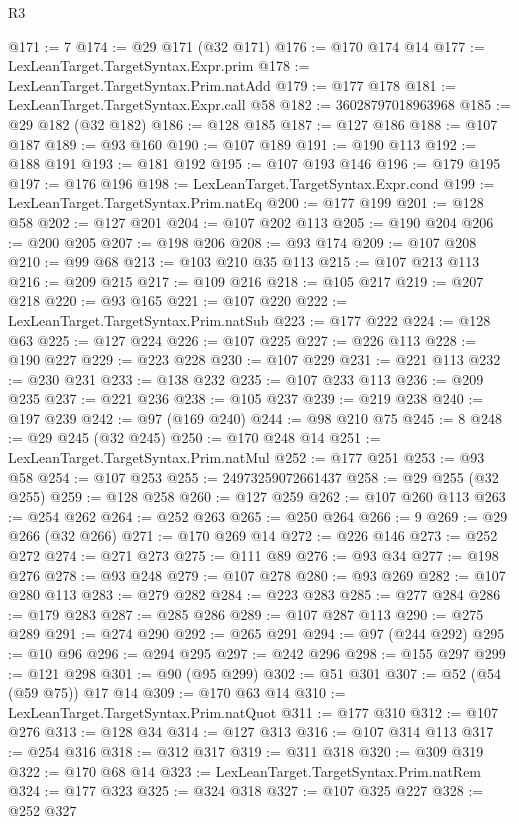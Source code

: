 \begin{lexlean}{R3}
\begin{coremodule}
@171 := 7
@174 := @29 @171 (@32 @171)
@176 := @170 @174 @14
@177 := LexLeanTarget.TargetSyntax.Expr.prim
@178 := LexLeanTarget.TargetSyntax.Prim.natAdd
@179 := @177 @178
@181 := LexLeanTarget.TargetSyntax.Expr.call @58
@182 := 36028797018963968
@185 := @29 @182 (@32 @182)
@186 := @128 @185
@187 := @127 @186
@188 := @107 @187
@189 := @93 @160
@190 := @107 @189
@191 := @190 @113
@192 := @188 @191
@193 := @181 @192
@195 := @107 @193 @146
@196 := @179 @195
@197 := @176 @196
@198 := LexLeanTarget.TargetSyntax.Expr.cond
@199 := LexLeanTarget.TargetSyntax.Prim.natEq
@200 := @177 @199
@201 := @128 @58
@202 := @127 @201
@204 := @107 @202 @113
@205 := @190 @204
@206 := @200 @205
@207 := @198 @206
@208 := @93 @174
@209 := @107 @208
@210 := @99 @68
@213 := @103 @210 @35 @113
@215 := @107 @213 @113
@216 := @209 @215
@217 := @109 @216
@218 := @105 @217
@219 := @207 @218
@220 := @93 @165
@221 := @107 @220
@222 := LexLeanTarget.TargetSyntax.Prim.natSub
@223 := @177 @222
@224 := @128 @63
@225 := @127 @224
@226 := @107 @225
@227 := @226 @113
@228 := @190 @227
@229 := @223 @228
@230 := @107 @229
@231 := @221 @113
@232 := @230 @231
@233 := @138 @232
@235 := @107 @233 @113
@236 := @209 @235
@237 := @221 @236
@238 := @105 @237
@239 := @219 @238
@240 := @197 @239
@242 := @97 (@169 @240)
@244 := @98 @210 @75
@245 := 8
@248 := @29 @245 (@32 @245)
@250 := @170 @248 @14
@251 := LexLeanTarget.TargetSyntax.Prim.natMul
@252 := @177 @251
@253 := @93 @58
@254 := @107 @253
@255 := 24973259072661437
@258 := @29 @255 (@32 @255)
@259 := @128 @258
@260 := @127 @259
@262 := @107 @260 @113
@263 := @254 @262
@264 := @252 @263
@265 := @250 @264
@266 := 9
@269 := @29 @266 (@32 @266)
@271 := @170 @269 @14
@272 := @226 @146
@273 := @252 @272
@274 := @271 @273
@275 := @111 @89
@276 := @93 @34
@277 := @198 @276
@278 := @93 @248
@279 := @107 @278
@280 := @93 @269
@282 := @107 @280 @113
@283 := @279 @282
@284 := @223 @283
@285 := @277 @284
@286 := @179 @283
@287 := @285 @286
@289 := @107 @287 @113
@290 := @275 @289
@291 := @274 @290
@292 := @265 @291
@294 := @97 (@244 @292)
@295 := @10 @96
@296 := @294 @295
@297 := @242 @296
@298 := @155 @297
@299 := @121 @298
@301 := @90 (@95 @299)
@302 := @51 @301
@307 := @52 (@54 (@59 @75)) @17 @14
@309 := @170 @63 @14
@310 := LexLeanTarget.TargetSyntax.Prim.natQuot
@311 := @177 @310
@312 := @107 @276
@313 := @128 @34
@314 := @127 @313
@316 := @107 @314 @113
@317 := @254 @316
@318 := @312 @317
@319 := @311 @318
@320 := @309 @319
@322 := @170 @68 @14
@323 := LexLeanTarget.TargetSyntax.Prim.natRem
@324 := @177 @323
@325 := @324 @318
@327 := @107 @325 @227
@328 := @252 @327

\end{coremodule}
\end{lexlean}
